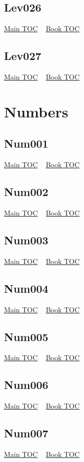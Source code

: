 \documentclass{book}
\begin{document}
  \section{Lev026}\hyperlink{toc}{Main TOC} ~ \hyperref[subsec:Lev]{Book TOC} 
  \section{Lev027}\hyperlink{toc}{Main TOC} ~ \hyperref[subsec:Lev]{Book TOC} 
  \chapter{Numbers} \label{subsec:Num} \begin{multicols}{2} \minitoc \end{multicols}
  \section{Num001}\hyperlink{toc}{Main TOC} ~ \hyperref[subsec:Num]{Book TOC} 
  \section{Num002}\hyperlink{toc}{Main TOC} ~ \hyperref[subsec:Num]{Book TOC} 
  \section{Num003}\hyperlink{toc}{Main TOC} ~ \hyperref[subsec:Num]{Book TOC} 
  \section{Num004}\hyperlink{toc}{Main TOC} ~ \hyperref[subsec:Num]{Book TOC} 
  \section{Num005}\hyperlink{toc}{Main TOC} ~ \hyperref[subsec:Num]{Book TOC} 
  \section{Num006}\hyperlink{toc}{Main TOC} ~ \hyperref[subsec:Num]{Book TOC} 
  \section{Num007}\hyperlink{toc}{Main TOC} ~ \hyperref[subsec:Num]{Book TOC} 
\end{document}
